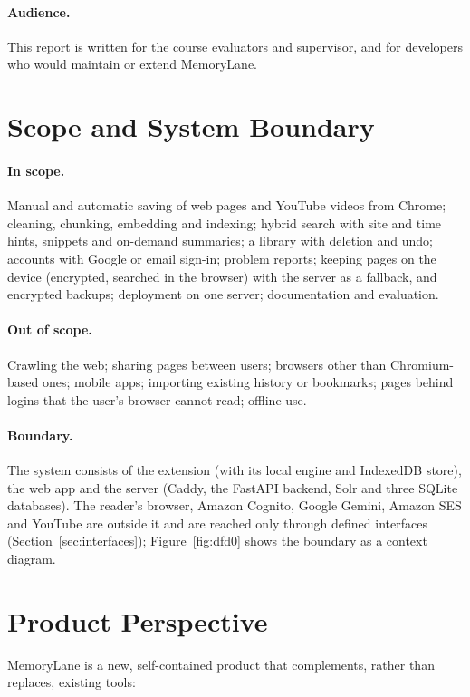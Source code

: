 \paragraph{Audience.} This report is written for the course evaluators and
supervisor, and for developers who would maintain or extend MemoryLane.

\section{Scope and System Boundary}

\paragraph{In scope.} Manual and automatic saving of web pages and YouTube
videos from Chrome; cleaning, chunking, embedding and indexing; hybrid search
with site and time hints, snippets and on-demand summaries; a library with
deletion and undo; accounts with Google or email sign-in; problem reports;
keeping pages on the device (encrypted, searched in the browser) with the
server as a fallback, and encrypted backups; deployment on one server;
documentation and evaluation.

\paragraph{Out of scope.} Crawling the web; sharing pages between users;
browsers other than Chromium-based ones; mobile apps; importing existing
history or bookmarks; pages behind logins that the user's browser cannot
read; offline use.

\paragraph{Boundary.} The system consists of the extension (with its local
engine and IndexedDB store), the web app and the server (Caddy, the FastAPI
backend, Solr and three SQLite databases). The
reader's browser, Amazon Cognito, Google Gemini, Amazon SES and YouTube are
outside it and are reached only through defined interfaces
(Section~\ref{sec:interfaces}); Figure~\ref{fig:dfd0} shows the boundary as a
context diagram.

\section{Product Perspective}

MemoryLane is a new, self-contained product that complements, rather than
replaces, existing tools:

